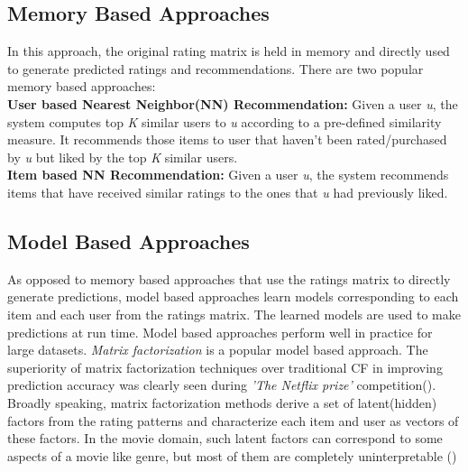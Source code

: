 \subsection {Memory Based Approaches}
In this approach, the original rating matrix is held in memory and directly used to generate predicted ratings and recommendations. There are two popular memory based approaches:\\
\textbf{User based Nearest Neighbor(NN) Recommendation:} Given a user \textit{u}, the system computes top \textit{K} similar users to \textit{u} according to a pre-defined similarity measure. It recommends those items to user that haven't been rated/purchased by \textit{u} but liked by the top \textit{K} similar users.\\
\textbf{Item based NN Recommendation:} Given a user \textit{u}, the system recommends items that have received similar ratings to the ones that \textit{u} had previously liked.
 


\subsection {Model Based Approaches}
As opposed to memory based approaches that use the ratings matrix to directly generate predictions, model based approaches learn models corresponding to each item and each user from the ratings matrix. The learned models are used to make predictions at run time.
Model based approaches perform well in practice for large datasets.
\textit{Matrix factorization} is a popular model based approach. The superiority of matrix factorization techniques over traditional CF in improving prediction accuracy was clearly seen during \textit{'The Netflix prize'} competition(\cite{koren}).
Broadly speaking, matrix factorization methods derive a set of latent(hidden) factors from the rating patterns and characterize each item and user as vectors of these factors.
In the movie domain, such latent factors can correspond to some aspects of a movie like genre, but most of them are completely uninterpretable (\cite{koren})


